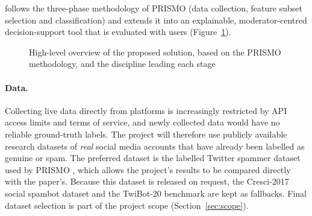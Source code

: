 \projectname{} follows the three-phase methodology of PRISMO \parencite{agrawal2018prismo} (data collection, feature subset selection and classification) and extends it into an explainable, moderator-centred decision-support tool that is evaluated with users (Figure~\ref{fig:solution-overview}).

\begin{figure}[htbp]
\centering
{}
\caption{High-level overview of the proposed \projectname{} solution, based on the PRISMO methodology, and the discipline leading each stage}
\label{fig:solution-overview}
\end{figure}

\paragraph{Data.} Collecting live data directly from platforms is increasingly restricted by API access limits and terms of service, and newly collected data would have no reliable ground-truth labels. The project will therefore use publicly available research datasets of \emph{real} social media accounts that have already been labelled as genuine or spam. The preferred dataset is the labelled Twitter spammer dataset used by PRISMO \parencite{benevenuto2010detecting}, which allows the project's results to be compared directly with the paper's. Because this dataset is released on request, the Cresci-2017 social spambot dataset \parencite{cresci2017paradigm} and the TwiBot-20 benchmark \parencite{feng2021twibot20} are kept as fallbacks. Final dataset selection is part of the project scope (Section~\ref{sec:scope}).

